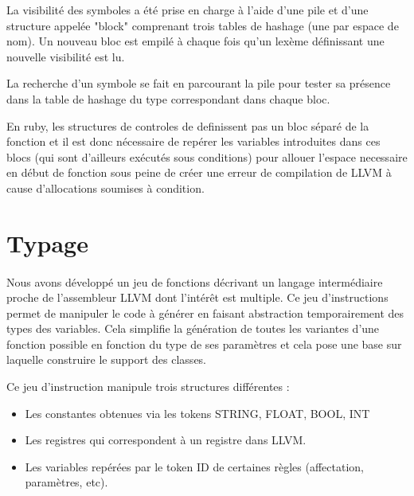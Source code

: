 \documentclass[12pt]{article}
\begin{document}
La visibilité des symboles a été prise en charge à l'aide d'une pile et d'une
structure appelée "block" comprenant trois tables de hashage (une par espace
de nom). Un nouveau bloc est empilé à chaque fois qu'un lexème définissant une
nouvelle visibilité est lu.

La recherche d'un symbole se fait en parcourant la pile pour
tester sa présence dans la table de hashage du type correspondant dans chaque
bloc.

En ruby, les structures de controles de definissent pas un bloc séparé de la
fonction et il est donc nécessaire de repérer les variables introduites dans
ces blocs (qui sont d'ailleurs exécutés sous conditions) pour allouer l'espace
necessaire en début de fonction sous peine de créer une erreur de compilation
de LLVM à cause d'allocations soumises à condition.



\section{Typage}

\paragraph{} Nous avons développé un jeu de fonctions décrivant un langage intermédiaire
proche de l'assembleur LLVM dont l'intérêt est multiple. Ce jeu d'instructions
permet de manipuler le code à générer en faisant abstraction temporairement
des types des variables. Cela simplifie la génération de toutes les variantes
d'une fonction possible en fonction du type de ses paramètres et cela pose une
base sur laquelle construire le support des classes.

Ce jeu d'instruction manipule trois structures différentes :
\begin{itemize}
	\item Les constantes obtenues via les tokens STRING, FLOAT, BOOL, INT
	\item Les registres qui correspondent à un registre dans LLVM.
	\item Les variables repérées par le token ID de certaines règles (affectation, paramètres, etc).
\end{itemize}
\end{document}
